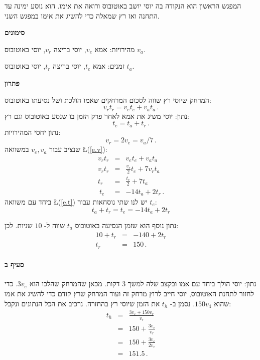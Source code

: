 \documentclass[12pt,a4paper]{article}
\begin{document}
המפגש הראשון הוא הנקודה בה יוסי יושב באוטובוס ורואה את אימו. הוא נוסע ימינה עד התחנה ואז רץ שמאלה כדי להשיג את אימו במפגש השני.

\medskip

\textbf{סימונים}

מהירויות: אמא $v_e$, יוסי בריצה $v_r$, יוסי באוטובוס $v_a$.

זמנים: אמא $t_e$, יוסי בריצה $t_r$, יוסי באוטובוס $t_a$.

\pagebreak[3]

\textbf{פתרון}

המרחק שיוסי רץ שווה לסכום המרחקים שאמו הולכת ושל נסיעתו באוטובוס:
\begin{equation}
v_r t_r = v_e t_e + v_a t_a\,. \label{e.v}
\end{equation}
נתון: יוסי משיג את אמא לאחר פרק הזמן בו שנסע באוטובוס וגם רץ:
\begin{equation}
t_e = t_a + t_r\,. \label{e.t}
\end{equation}
נתון יחסי המהירויות:
\[
v_r = 2v_e = v_a/7\,.
\]
שנציב עבור
$v_e, v_a$
במשוואה
\L{(\ref{e.v})}:
\begin{eqnarray*}
v_r t_r &=& v_e t_e + v_a t_a\\
v_r t_r &=& \frac{v_r}{2} t_e + 7v_r t_a\\
t_r &=& \frac{t_e}{2}+ 7t_a\\\
t_e &=& -14t_a + 2t_r\,.
\end{eqnarray*}
ביחד עם משוואה
\L{(\ref{e.t})}
 יש לנו שתי נוסחאות עבור
$t_e$:
\[
t_a + t_r = t_e = -14t_a + 2t_r
\]

נתון נוסף הוא שזמן הנסיעה באוטובוס
$t_a$
שווה ל-
$10$
שניות. לכן: 
\begin{eqnarray*}
10+t_r &=& -140 + 2t_r\\
t_r &=& 150\,.
\end{eqnarray*}


\vspace{-4ex}\paragraph{סעיף ב}

נתון: יוסי הולך ביחד עם אמו ובקצב שלה למשך
$3$
דקות. מכאן שהמרחק שהלכו הוא
$3v_e$.
כדי לחזור לתחנת האוטובוס, יוסי חייב לרוץ מרחק זה ועוד המרחק שרץ קודם כדי להשיג את אמו שהוא
$150v_4$.
נסמן ב-
$t_h$
את הזמן שיוסי רץ בהחזרה. נרכיב את הכל הנתונים ונקבל:
\begin{eqnarray*}
t_h &=& \frac{3v_e + 150v_r}{v_r}\\
&=& 150 + \frac{3v_e}{v_r}\\
&=& 150 + \frac{3v_e}{2v_e}\\
&=& 151.5\,.
\end{eqnarray*}
\end{document}
